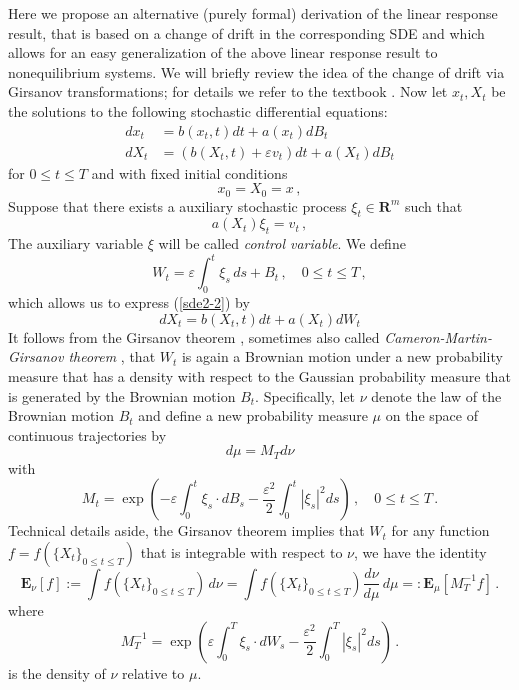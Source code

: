 \documentclass[aip,jcp,a4paper,reprint,onecolumn]{revtex4-1}
\newcommand{\R}{{\mathbf R}}
\newcommand{\eps}{\varepsilon}
\newcommand{\bE}{{\mathbf E}}
\newcommand{\wrt}{with respect to }
\begin{document}
Here we propose an alternative (purely formal) derivation of the linear response result, that is based on a change of drift in the corresponding SDE and which allows for an easy generalization of the above linear response result to nonequilibrium systems. We will briefly review the idea of the change of drift via Girsanov transformations; for details we refer to the textbook \cite{oksendal}. Now let $x_{t},X_{t}$ be the solutions to the following stochastic differential equations:
\begin{subequations}\label{sde2}
\begin{align}
dx_{t} & = b(x_{t},t)dt + a(x_{t})dB_{t} \label{sde2-1}\\
dX_{t} & = (b(X_{t},t) + \eps v_{t})dt +a(X_{t})dB_{t} \label{sde2-2}
\end{align}
\end{subequations}
for $0\le t\le T$ and with fixed initial conditions
\[
x_{0} = X_{0} = x\,,
\]
Suppose that there exists a auxiliary stochastic process $\xi_{t}\in\R^{m}$ such that 
\begin{equation}\label{xi}
a(X_{t})\xi_{t} = v_{t}\,,
\end{equation}
The auxiliary variable $\xi$ will be called \emph{control variable}. We define  
\[
W_{t} = \eps\int_{0}^{t}\xi_{s}\,ds + B_{t}\,,\quad 0\le t\le T\,,
\]
which allows us to express (\ref{sde2-2}) by
\begin{equation}\label{sde2-3}
dX_{t} = b(X_{t},t)dt +a(X_{t})dW_{t} 
\end{equation}
It follows from the Girsanov theorem \cite[Thm.~8.6.8]{oksendal2003}, sometimes also called \emph{Cameron-Martin-Girsanov theorem} \cite{}, that $W_{t}$ is again a Brownian motion under a new probability measure that has a density \wrt the Gaussian probability measure that is generated by the Brownian motion $B_{t}$. Specifically, let $\nu$ denote the law of the Brownian motion $B_{t}$ and define a new probability measure $\mu$ on the space of continuous trajectories by 
\[
d\mu=M_{T}d\nu
\]
with 
\begin{equation}\label{likelihood}
M_{t} = \exp\left(-\eps\int_{0}^{t}\xi_{s}\cdot dB_{s} - \frac{\eps^{2}}{2}\int_{0}^{t}|\xi_{s}|^{2}ds\right)\,,\quad 0\le t\le T\,.
\end{equation}
Technical details aside, the Girsanov theorem implies that $W_{t}$  for any function $f=f(\{X_{t}\}_{0\le t\le T})$ that is integrable \wrt $\nu$, we have the identity
\[
\bE_{\nu}[f] := \int f(\{X_{t}\}_{0\le t\le T})\, d\nu = \int f(\{X_{t}\}_{0\le t\le T}) \frac{d\nu}{d\mu}\,d\mu =: \bE_{\mu}[M^{-1}_{T}f]\,.
\]
where 
\[
M_{T}^{-1} = \exp\left(\eps\int_{0}^{T}\xi_{s}\cdot dW_{s} - \frac{\eps^{2}}{2}\int_{0}^{T}|\xi_{s}|^{2}ds\right)\,.
\]
is the density of $\nu$ relative to $\mu$. 
\end{document}
